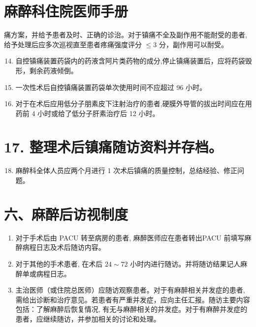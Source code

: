 \documentclass[10pt]{article}
\begin{document}
\section*{麻醉科住院医师手册}
痛方案，并给予患者及时、正确的诊治。对于镇痛不全及副作用不能耐受的患者, 给予处理后应多次巡视直至患者疼痛强度评分 $\leqslant 3$ 分，副作用可以耐受。

\begin{enumerate}
  \setcounter{enumi}{13}
  \item 自控镇痛装置药袋内的药液含阿片类药物的成分,停止镇痛装置后，应将药袋毁形，剩余药液倾倒。

  \item 一次性术后自控镇痛装置药袋单次使用时间不应超过 96 小时。

  \item 对于在术后应用低分子朋素皮下注射治疗的患者,硬膜外导管的拔出时间应在用药前 4 小时或给了低分子肝素治疗后 12 小时。

\end{enumerate}

\section*{17. 整理术后镇痛随访资料并存档。}
\begin{enumerate}
  \setcounter{enumi}{17}
  \item 麻醉科全体人员应两个月进行 1 次术后镇痛的质量控制，总结经验、修正问题。
\end{enumerate}

\section*{六、麻醉后访视制度}
\begin{enumerate}
  \item 对于手术后由 PACU 转至病房的患者, 麻醉医师应在患者转出PACU 前填写麻醉病程日志及术后随访内容。

  \item 对于其他的手术患者, 在术后 $24 \sim 72$ 小时内进行随访。并将随访结果记人麻醉单或病程日志。

  \item 主治医师（或住院总医师）应随访观察患者。对于有麻醉相关并发症的患者, 需给出诊断和治疗意见。若患者有严重并发症，应向主任汇报。随访主要内容包括：了解麻醉后恢复情况, 有无与麻醉相关的并发症。对于有麻醉并发症的患者，应继续随访，并参加相关的讨论和处理。

\end{enumerate}
\end{document}
